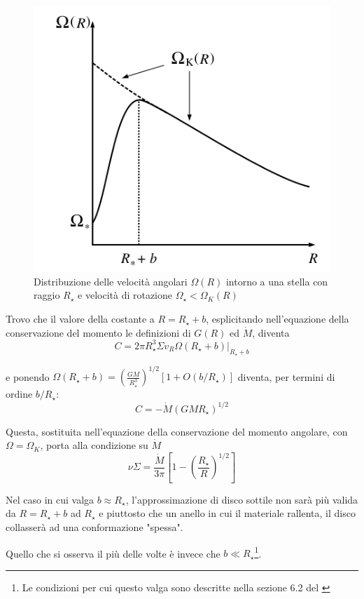 \documentclass[a4paperbi]{article}
\begin{document}
	\begin{figure}[H]
		\centering
		\includegraphics[width=0.6\linewidth]{InnerRegionAngularVelocity}
		\caption{Distribuzione delle velocità angolari $\Omega(R)$ intorno a una stella con raggio $R_\star$ e velocità di rotazione $\Omega_{\star}<\Omega_K(R)$}
		\label{fig:InnerRegionAngularVelocity}
	\end{figure}

	Trovo che il valore della costante a $R=R_{\star}+b$, esplicitando nell'equazione della conservazione del momento le definizioni di $G(R)$ ed $\dot{M}$, diventa
	\begin{equation*}
		C=2\pi R_{\star}^3\Sigma v_R\Omega(R_{\star}+b)\vert_{R_{\star}+b}
	\end{equation*}
	
	e ponendo $\Omega(R_{\star}+b)=\left(\frac{GM}{R_{\star}^3}\right)^{1/2}[1+O(b/R_{\star})]$ diventa, per termini di ordine $b/R_{\star}$:
	\begin{equation}
		C=-\dot{M}(GMR_{\star})^{1/2}
	\end{equation}	

	Questa, sostituita nell'equazione della conservazione del momento angolare, con $\Omega=\Omega_K$, porta alla condizione su $\dot{M}$
	\begin{equation}
		\nu\Sigma=\frac{\dot{M}}{3\pi}\left[1-\left(\frac{R_{\star}}{R}\right)^{1/2}\right]
	\end{equation}
	
	Nel caso in cui valga $b\approx R_{\star}$, l'approssimazione di disco sottile non sarà più valida da $R=R_{\star}+b$ ad $R_{\star}$ e piuttosto che un anello in cui il materiale rallenta, il disco collasserà ad una conformazione "spessa".
	
	Quello che si osserva il più delle volte è invece che $b\ll R_{\star}$\footnote{Le condizioni per cui questo valga sono descritte nella sezione 6.2 del \cite{FrankKingRaineAccretionPower}}.	
	
\end{document}
